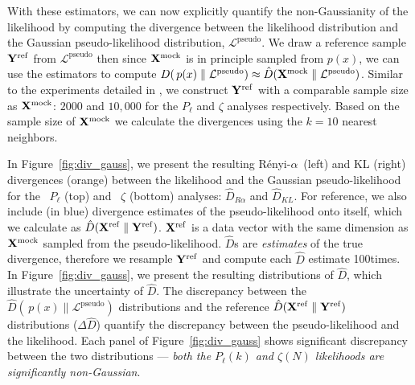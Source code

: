 \documentclass[12pt, letterpaper, preprint]{aastex}
\newcommand{\Nd}{100}
\newcommand{\Xmock}{{\bf X}^\mathrm{mock}}
\newcommand{\Xref}{{\bf X}^\mathrm{ref}}
\newcommand{\Yref}{{\bf Y}^\mathrm{ref}}
\newcommand{\Ralpha}{R\'enyi-$\alpha$}
\newcommand{\Beut}{\citetalias{beutler2017}}
\newcommand{\Sinh}{\citetalias{sinha2017}}
\begin{document}
With these estimators, we can now explicitly quantify the 
non-Gaussianity of the likelihood by computing the divergence 
between the likelihood distribution and the Gaussian 
pseudo-likelihood distribution, $\mathcal{L}^\mathrm{pseudo}$.
We draw a reference sample ${\bf Y}^\mathrm{ref}$ from 
$\mathcal{L}^\mathrm{pseudo}$ then %
since $\Xmock$ is in principle sampled from $p(x)$, we can use the 
estimators to compute 
$D(\, p(x) \parallel \mathcal{L}^\mathrm{pseudo}) \approx \hat{D}(\Xmock \parallel \mathcal{L}^\mathrm{pseudo})$. %
Similar to the experiments detailed in \cite{poczos2012}, 
we construct ${\bf Y}^\mathrm{ref}$ with a comparable sample size as $\Xmock$: 
$2000$ and $10,000$ for the $P_\ell$ and $\zeta$ analyses respectively. 
Based on the sample size of $\Xmock$ we calculate the divergences using 
the $k=10$ nearest neighbors. 

In Figure~\ref{fig:div_gauss}, we present the resulting \Ralpha~(left) 
and KL (right) divergences (orange) between the likelihood and the 
Gaussian pseudo-likelihood for the \Beut~$P_\ell$ (top) and \Sinh~$\zeta$ (bottom) 
analyses: $\hat{D}_{R\alpha}$ and $\hat{D}_{KL}$. For reference, we also 
include (in blue) divergence estimates of the pseudo-likelihood onto itself, 
which we calculate as $\hat{D}(\Xref \parallel \Yref)$. $\Xref$ is a 
data vector with the same dimension as $\Xmock$ sampled from the pseudo-likelihood. 
$\hat{D}$s are \emph{estimates} of the true divergence, therefore we 
resample $\Yref$ and compute each $\hat{D}$ estimate \Nd times. 
In Figure~\ref{fig:div_gauss}, we present the resulting distributions of $\hat{D}$,
which illustrate the uncertainty of $\hat{D}$. The discrepancy between 
the $\hat{D}(\, p(x) \parallel \mathcal{L}^\mathrm{pseudo})$
distributions and the reference $\hat{D}(\Xref \parallel \Yref)$ distributions 
($\Delta \hat{D}$) quantify the discrepancy between the pseudo-likelihood
and the likelihood. Each panel of Figure~\ref{fig:div_gauss} shows significant 
discrepancy between the two distributions --- \emph{both 
the $P_\ell(k)$ and $\zeta(N)$ likelihoods are significantly non-Gaussian}. 
\end{document}

